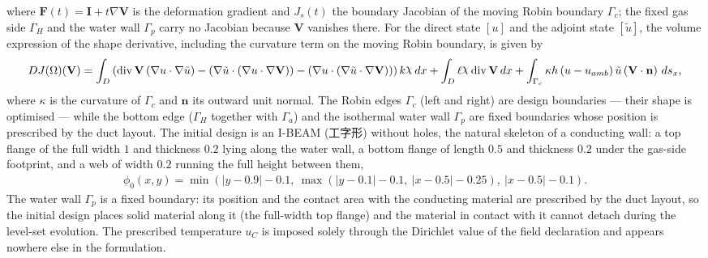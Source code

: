 \documentclass[preview]{standalone}
\let\oldcdot\cdot
\let\cdot\oldcdot
\begin{document}
where $\mathbf F(t) = \mathbf I + t \nabla \mathbf V$ is the deformation gradient and $J_{s}(t)$ the boundary Jacobian of the moving Robin boundary $\Gamma_c$; the fixed gas side $\Gamma_H$ and the water wall $\Gamma_p$ carry no Jacobian because $\mathbf V$ vanishes there.
For the direct state $\left[ u\right]$ and the adjoint state $\left[ \tilde u\right]$, the volume expression of the shape derivative, including the curvature term on the moving Robin boundary, is given by
\begin{dmath*}
DJ(\Omega)(\mathbf V) = \int_{D} \left(\operatorname{div} {\mathbf V} \left(  \nabla u  \cdot  \nabla \tilde u  \right) - \left(  \nabla \tilde u  \cdot \left(  \nabla u  \cdot  \nabla {\mathbf V}  \right) \right) - \left(  \nabla u  \cdot \left(  \nabla \tilde u  \cdot  \nabla {\mathbf V}  \right) \right)\right) k \raisebox{\depth}{$\chi$} \,dx + \int_{D} \ell \raisebox{\depth}{$\chi$} \operatorname{div} {\mathbf V} \,dx + \int_{\Gamma_c} \kappa h \left( u - u_{amb}\right) \tilde u \left(\mathbf V \cdot \mathbf n\right) \,ds_x ,
\end{dmath*}
where $\kappa$ is the curvature of $\Gamma_c$ and $\mathbf n$ its outward unit normal.  The Robin edges $\Gamma_c$ (left and right) are design boundaries — their shape is optimised — while the bottom edge ($\Gamma_H$ together with $\Gamma_a$) and the isothermal water wall $\Gamma_p$ are fixed boundaries whose position is prescribed by the duct layout.
The initial design is an I-BEAM (工字形) without holes, the natural skeleton of a conducting wall: a top flange of the full width $1$ and thickness $0.2$ lying along the water wall, a bottom flange of length $0.5$ and thickness $0.2$ under the gas-side footprint, and a web of width $0.2$ running the full height between them,
\begin{align*}
\phi_0(x,y) = \min\left( \left| y - 0.9 \right| - 0.1 ,\ \max\left( \left| y - 0.1 \right| - 0.1 ,\ \left| x - 0.5 \right| - 0.25 \right),\ \left| x - 0.5 \right| - 0.1 \right).
\end{align*}
The water wall $\Gamma_p$ is a fixed boundary: its position and the contact area with the conducting material are prescribed by the duct layout, so the initial design places solid material along it (the full-width top flange) and the material in contact with it cannot detach during the level-set evolution.  The prescribed temperature $u_C$ is imposed solely through the Dirichlet value of the field declaration and appears nowhere else in the formulation.
\end{document}
